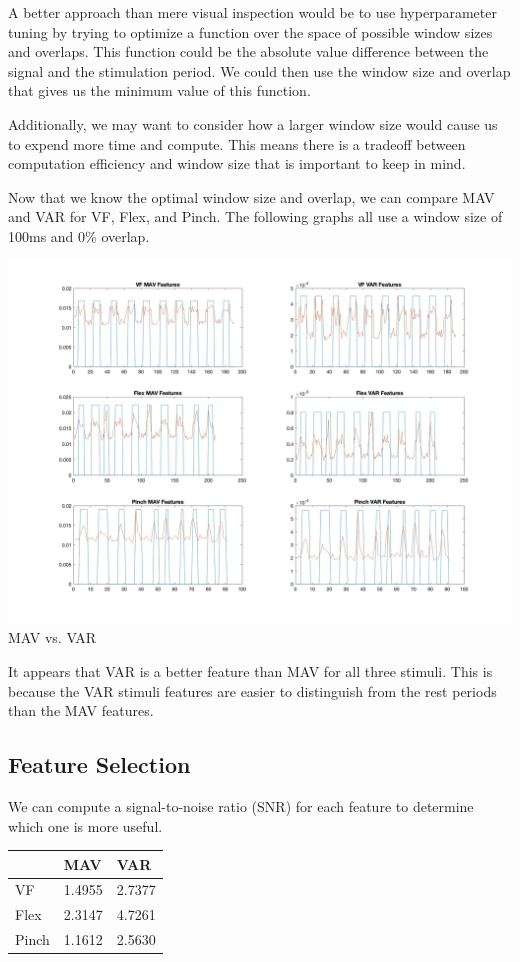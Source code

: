 \documentclass[12pt]{article}
\begin{document}
A better approach than mere visual inspection would be to use hyperparameter tuning by trying to optimize a function over the space of possible window sizes and overlaps. This function could be the absolute value difference between the signal and the stimulation period. We could then use the window size and overlap that gives us the minimum value of this function.

Additionally, we may want to consider how a larger window size would cause us to expend more time and compute. This means there is a tradeoff between computation efficiency and window size that is important to keep in mind. 

Now that we know the optimal window size and overlap, we can compare MAV and VAR for VF, Flex, and Pinch. The following graphs all use a window size of 100ms and 0\% overlap.

\begin{center}
    \includegraphics[width=\textwidth]{mav_var_comparison.jpg}
    MAV vs. VAR
\end{center}

It appears that VAR is a better feature than MAV for all three stimuli. This is because the VAR stimuli features are easier to distinguish from the rest periods than the MAV features.

\subsection{Feature Selection}
We can compute a signal-to-noise ratio (SNR) for each feature to determine which one is more useful.

\begin{center}
    \begin{tabular}{@{}lll@{}}
        \toprule
            & MAV    & VAR    \\ \midrule
        VF    & 1.4955 & 2.7377 \\
        Flex  & 2.3147 & 4.7261 \\
        Pinch & 1.1612 & 2.5630 \\ \bottomrule
    \end{tabular}
\end{center}
\end{document}
